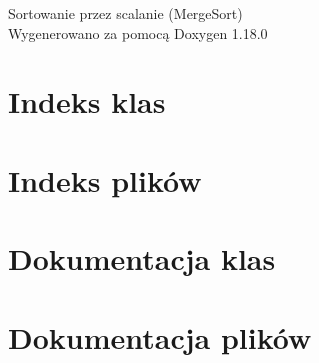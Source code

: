 \documentclass[twoside]{book}
\newcommand{\+}{\discretionary{\mbox{\scriptsize$\hookleftarrow$}}{}{}}
\newcommand{\clearemptydoublepage}{%
    \newpage{\pagestyle{empty}\cleardoublepage}%
  }
\begin{document}
  \raggedbottom
    \hypersetup{pageanchor=false,
                bookmarksnumbered=true,
                pdfencoding=unicode
               }
  \begin{titlepage}
  \vspace*{7cm}
  \begin{center}%
  {\Large Sortowanie przez scalanie (\+Merge\+Sort)}\\
  \vspace*{1cm}
  {\large Wygenerowano za pomocą Doxygen 1.18.0}\\
  \end{center}
  \end{titlepage}
  \clearemptydoublepage
  \tableofcontents
  \clearemptydoublepage
  \hypersetup{pageanchor=true}

\chapter{Indeks klas}

\chapter{Indeks plików}

\chapter{Dokumentacja klas}

\chapter{Dokumentacja plików}




  \backmatter
  \newpage
  \clearemptydoublepage
  \printindex
\end{document}
